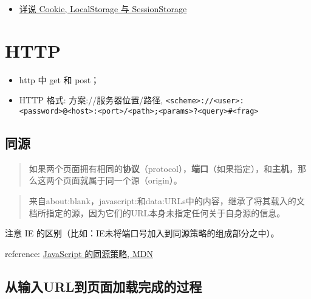 \begin{itemize}
\tightlist
\item
  \href{http://jerryzou.com/posts/cookie-and-web-storage/}{详说 Cookie,
  LocalStorage 与 SessionStorage}
\end{itemize}

\section{HTTP}\label{http}

\begin{itemize}
\tightlist
\item
  http 中 get 和 post；
\item
  HTTP 格式: 方案://服务器位置/路径,
  \lstinline!<scheme>://<user>:<password>@<host>:<port>/<path>;<params>?<query>#<frag>!
\end{itemize}

\subsection{同源}\label{ux540cux6e90}

\begin{quote}
如果两个页面拥有相同的\textbf{协议}（protocol），\textbf{端口}（如果指定），和\textbf{主机}，那么这两个页面就属于同一个源（origin）。
\end{quote}

\begin{quote}
来自about:blank，javascript:和data:URLs中的内容，继承了将其载入的文档所指定的源，因为它们的URL本身未指定任何关于自身源的信息。
\end{quote}

注意 IE 的区别（比如：IE未将端口号加入到同源策略的组成部分之中）。

reference:
\href{https://developer.mozilla.org/zh-CN/docs/Web/Security/Same-origin_policy}{JavaScript
的同源策略, MDN}

\subsection{从输入URL到页面加载完成的过程}\label{ux4eceux8f93ux5165urlux5230ux9875ux9762ux52a0ux8f7dux5b8cux6210ux7684ux8fc7ux7a0b}

